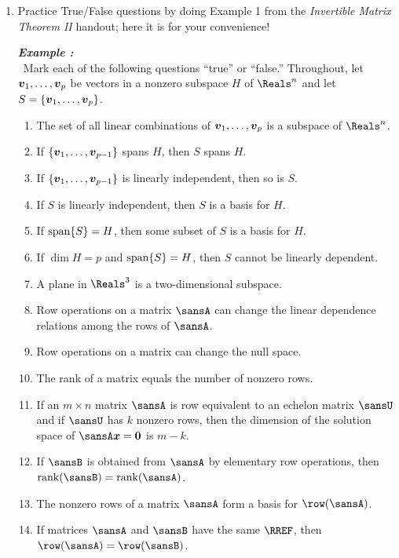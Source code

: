 \documentclass[12pt]{article}
\newcounter{Exx}
\newcommand{\exbox}[1]{\stepcounter{Exx}\vspace{3mm}\begin{tcolorbox}[breakable,arc=2pt,boxrule=1pt,right=6mm,top=3mm,bottom=6mm]\noindent\textit{\large\bfseries Example \theExx:\\[3mm]}~#1\end{tcolorbox}}
\begin{document}
\begin{enumerate}[topsep=0.125in, itemsep=0.625in]
\begin{enumerate}[itemsep=0.25in,topsep=4.5mm]
			\begin{flushright}\end{flushright}
		\end{enumerate}
		
		\newpage
		
		\item Practice True/False questions by doing Example 1 from the \textit{Invertible Matrix Theorem II} handout; here it is for your convenience!
		\exbox{Mark each of the following questions ``true'' or ``false.'' Throughout, let $\boldsymbol{v}_1,\ldots,\boldsymbol{v}_p$ be vectors in a nonzero subspace $H$ of $\Reals^n$ and let $S=\{\boldsymbol{v}_1,\ldots,\boldsymbol{v}_p\}$. \justify
		\begin{enumerate}[label=(\alph*)]
			\item The set of all linear combinations of $\boldsymbol{v}_1,\ldots,\boldsymbol{v}_p$ is a subspace of $\Reals^n$.
			\item If $\{\boldsymbol{v}_1,\ldots,\boldsymbol{v}_{p-1}\}$ spans $H$, then $S$ spans $H$.
			\item If $\{\boldsymbol{v}_1,\ldots,\boldsymbol{v}_{p-1}\}$ is linearly independent, then so is $S$.
			\item If $S$ is linearly independent, then $S$ is a basis for $H$.
			\item If $\operatorname{span}\{S\}=H$, then some subset of $S$ is a basis for $H$.
			\item If $\dim H=p$ and $\operatorname{span}\{S\}=H$, then $S$ cannot be linearly dependent.
			\item A plane in $\Reals^3$ is a two-dimensional subspace.
			\item Row operations on a matrix $\sansA$ can change the linear dependence relations among the rows of $\sansA$.
			\item Row operations on a matrix can change the null space.
			\item The rank of a matrix equals the number of nonzero rows.
			\item If an $m\times n$ matrix $\sansA$ is row equivalent to an echelon matrix $\sansU$ and if $\sansU$ has $k$ nonzero rows, then the dimension of the solution space of $\sansA\vect{x}=\vect{0}$ is $m-k$.
			\item If $\sansB$ is obtained from $\sansA$ by elementary row operations, then $\rank(\sansB)=\rank(\sansA)$.
			\item The nonzero rows of a matrix $\sansA$ form a basis for $\row(\sansA)$.
			\item If matrices $\sansA$ and $\sansB$ have the same $\RREF$, then $\row(\sansA)=\row(\sansB)$.

\end{enumerate}}
\end{enumerate}
\end{document}

